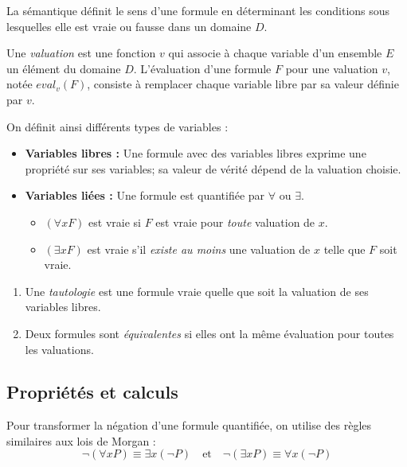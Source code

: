 La sémantique définit le sens d'une formule en déterminant les conditions sous lesquelles elle est vraie ou fausse 
dans un domaine $D$.

\begin{definition}[Valuation]
    Une \emph{valuation} est une fonction $v$ qui associe à chaque variable d'un ensemble $E$ un élément du domaine $D$.
    L'évaluation d'une formule $F$ pour une valuation $v$, notée $eval_v(F)$, consiste à remplacer chaque variable libre
    par sa valeur définie par $v$.
\end{definition}

On définit ainsi différents types de variables : 
\begin{itemize}
    \item \textbf{Variables libres :} Une formule avec des variables libres exprime une propriété sur ses variables; 
    sa valeur de vérité dépend de la valuation choisie.
    \item \textbf{Variables liées :} Une formule est quantifiée par $\forall$ ou $\exists$. 
    \begin{itemize}
        \item $(\forall x F)$ est vraie si $F$ est vraie pour \emph{toute} valuation de $x$.
        \item $(\exists x F)$ est vraie s'il \emph{existe au moins} une valuation de $x$ telle que $F$ soit vraie.
    \end{itemize}
\end{itemize}

\begin{definition}
    \begin{enumerate}[label=\roman*)]
        \item Une \emph{tautologie} est une formule vraie quelle que soit la valuation de ses variables libres.
        \item Deux formules sont \emph{équivalentes} si elles ont la même évaluation pour toutes les valuations.
    \end{enumerate}
\end{definition}

\subsection{Propriétés et calculs}

\begin{proposition}
    Pour transformer la négation d'une formule quantifiée, on utilise des règles similaires aux lois de Morgan :
        $$ \neg(\forall x P) \equiv \exists x (\neg P) \quad \text{et} \quad \neg(\exists x P) \equiv \forall x (\neg P) $$
\end{proposition}


